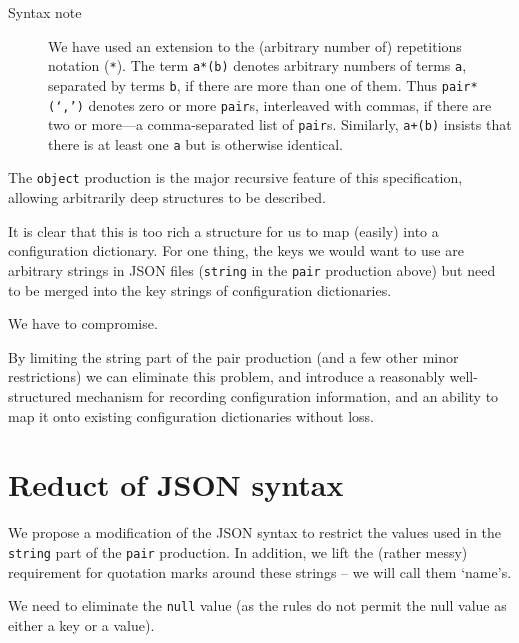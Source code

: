 \documentclass[a4paper,twoside,12pt]{article}
\begin{document}
\begin{description}
\item[Syntax note] We have used an extension to the (arbitrary number of) repetitions notation (\texttt{*}). The term \texttt{a*(b)} denotes arbitrary numbers of terms \texttt{a}, separated by terms \texttt{b}, if there are more than one of them. Thus \texttt{pair*(`,')} denotes zero or more \texttt{pair}s, interleaved with commas, if there are two or more---a comma-separated list of \texttt{pair}s. Similarly, \texttt{a+(b)} insists that there is at least one \texttt{a} but is otherwise identical.
\end{description}
The \texttt{object} production is the major recursive feature of this specification, allowing arbitrarily deep structures to be described.
 
It is clear that this is too rich a structure for us to map (easily) into a configuration dictionary. For one thing, the keys we would want to use are arbitrary strings in JSON files (\texttt{string} in the \texttt{pair} production above) but need to be merged into the key strings of configuration dictionaries.

We have to compromise.

By limiting the string part of the pair production (and a few other minor restrictions) we can eliminate this problem, and introduce a reasonably well-structured mechanism for recording configuration information, and an ability to map it onto existing configuration dictionaries without loss.

\section{Reduct of JSON syntax}
We propose a modification of the JSON syntax to restrict the values used in the \texttt{string} part of the \texttt{pair} production. In addition, we lift the (rather messy) requirement for quotation marks around these strings -- we will call them `name's.

We need to eliminate the \texttt{null} value (as the rules do not permit the null value as either a key or a value).
\end{document}
